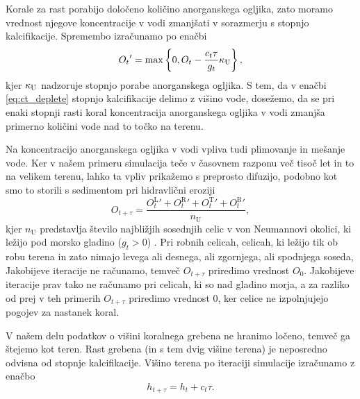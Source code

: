 \documentclass[9pt]{style/friteza}
\begin{document}
Korale za rast porabijo določeno količino anorganskega ogljika, zato moramo vrednost njegove koncentracije v vodi zmanjšati v sorazmerju s stopnjo kalcifikacije. Spremembo izračunamo po enačbi
\begin{equation} \label{eq:ct_deplete}
{O_t}' = \max\left\{0, O_t - \frac{c_t\tau}{g_t} {\kappa_\mathrm{U}} \right\},
\end{equation}
kjer ${\kappa_\mathrm{U}}$ nadzoruje stopnjo porabe anorganskega ogljika. S tem, da v enačbi \eqref{eq:ct_deplete} stopnjo kalcifikacije delimo z višino vode,  dosežemo, da se pri enaki stopnji rasti koral koncentracija anorganskega ogljika v vodi zmanjša primerno količini vode nad to točko na terenu.

Na koncentracijo anorganskega ogljika v vodi vpliva tudi plimovanje in mešanje vode. Ker v našem primeru simulacija teče v časovnem razponu več tisoč let in to na velikem terenu, lahko ta vpliv prikažemo s preprosto difuzijo, podobno kot smo to storili s sedimentom pri hidravlični eroziji%
\begin{equation} \label{eq:ct_diffusion_jacobi}
O_{t + \tau} = \frac{{O^\mathrm{L}_{t}}' + {O^\mathrm{R}_{t}}' + {O^\mathrm{T}_{t}}' + {O^\mathrm{B}_{t}}'}{n_\mathrm{U}},
\end{equation}
kjer $n_\mathrm{U}$ predstavlja število najbližjih sosednjih celic v von Neumannovi okolici, ki ležijo pod morsko gladino ($g_t > 0$) \cite{laplace_gpu}. Pri robnih celicah, celicah, ki ležijo tik ob robu terena in zato nimajo levega ali desnega, ali zgornjega, ali spodnjega soseda, Jakobijeve iteracije ne računamo, temveč $O_{t+\tau}$ priredimo vrednost $O_0$. Jakobijeve iteracije prav tako ne računamo pri celicah, ki so nad gladino morja, a za razliko od prej v teh primerih $O_{t+\tau}$ priredimo vrednost 0, ker celice ne izpolnjujejo pogojev za nastanek koral.

V našem delu podatkov o višini koralnega grebena ne hranimo ločeno, temveč ga štejemo kot teren. Rast grebena (in s tem dvig višine terena) je neposredno odvisna od stopnje kalcifikacije. Višino terena po iteraciji simulacije izračunamo z enačbo
\begin{equation} \label{eq:final_h}
h_{t + \tau} = h_t + c_t \tau.
\end{equation}
\end{document}
